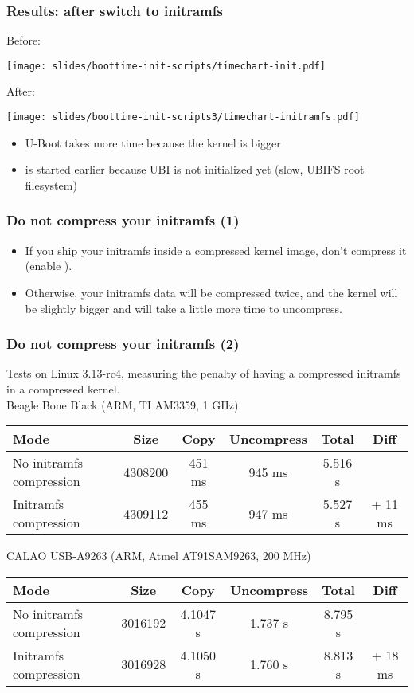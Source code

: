\begin{frame}
\frametitle{Results: after switch to initramfs}
Before:
\begin{center}
    \texttt{[image: slides/boottime-init-scripts/timechart-init.pdf]}
\end{center}
After:
\begin{center}
    \texttt{[image: slides/boottime-init-scripts3/timechart-initramfs.pdf]}
\end{center}
\begin{itemize}
\item U-Boot takes more time because the kernel is bigger
\item {} is started earlier because UBI is not initialized yet
      (slow, UBIFS root filesystem)
\end{itemize}
\end{frame}

\begin{frame}
\frametitle{Do not compress your initramfs (1)}
\begin{itemize}
\item If you ship your initramfs inside a compressed kernel image, don't compress
      it \\
      (enable ).
\item Otherwise, your initramfs data will be compressed twice, and
      the kernel will be slightly bigger and will take a little more time to uncompress. 
\end{itemize}
\end{frame}

\begin{frame}
\frametitle{Do not compress your initramfs (2)}
Tests on Linux 3.13-rc4, measuring the penalty of having a
 compressed initramfs in a  compressed kernel. \\
\vfill{}
\scriptsize
Beagle Bone Black (ARM, TI AM3359, 1 GHz)
\begin{tabular}{| l || c | c | c | c | c | }
\hline
Mode & Size & Copy & Uncompress & Total & Diff \\
\hline
No initramfs compression & 4308200 & 451 ms & 945 ms & 5.516 s & \\
Initramfs compression & 4309112 & 455 ms & 947 ms & 5.527 s & + 11 ms \\
\hline
\end{tabular}
\newline\newline
CALAO USB-A9263 (ARM, Atmel AT91SAM9263, 200 MHz)
\begin{tabular}{| l || c | c | c | c | c | }
\hline
Mode & Size & Copy & Uncompress & Total & Diff \\
\hline
No initramfs compression & 3016192 & 4.1047 s & 1.737 s & 8.795 s & \\
Initramfs compression & 3016928 & 4.1050 s & 1.760 s  & 8.813 s & + 18 ms \\
\hline
\end{tabular}
\end{frame}

